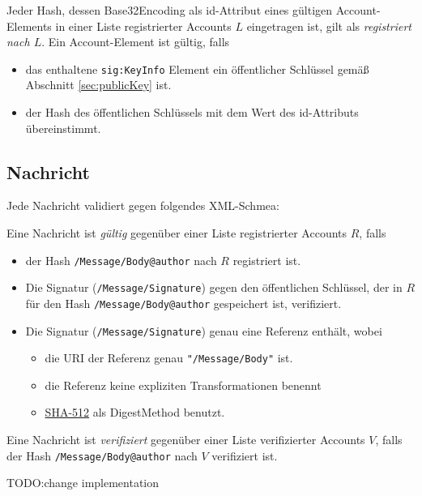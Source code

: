 \documentclass[a4paper,10pt]{article}
\begin{document}
Jeder Hash, dessen Base32Encoding als id-Attribut eines gültigen Account-Elements in einer Liste registrierter Accounts $L$  eingetragen ist, gilt als \emph{registriert nach $L$}. 
Ein Account-Element ist gültig, falls
\begin{itemize}
 \item das enthaltene \texttt{sig:KeyInfo} Element ein öffentlicher Schlüssel gemäß Abschnitt \ref{sec:publicKey} ist.
 \item der Hash des öffentlichen Schlüssels mit dem Wert des id-Attributs übereinstimmt.
\end{itemize}

\subsection{Nachricht}
Jede Nachricht validiert gegen folgendes XML-Schmea:


Eine Nachricht ist \emph{gültig} gegenüber einer Liste registrierter Accounts $R$, falls
\begin{itemize}
 \item der Hash \texttt{/Message/Body@author} nach $R$ registriert ist.
 \item Die Signatur (\texttt{/Message/Signature}) gegen den öffentlichen Schlüssel, der in $R$ für den Hash \texttt{/Message/Body@author} gespeichert ist, verifiziert.
 \item Die Signatur (\texttt{/Message/Signature}) genau eine Referenz enthält, wobei
 \begin{itemize}
  \item die URI der Referenz genau \texttt{"/Message/Body"} ist.
  \item die Referenz keine expliziten Transformationen benennt
  \item \href{http://www.w3.org/2001/04/xmlenc#sha512}{SHA-512} als DigestMethod benutzt.
 \end{itemize}
\end{itemize}

Eine Nachricht ist \emph{verifiziert} gegenüber einer Liste verifizierter Accounts $V$, falls der Hash \texttt{/Message/Body@author} nach $V$ verifiziert ist.

TODO:change implementation
\end{document}
